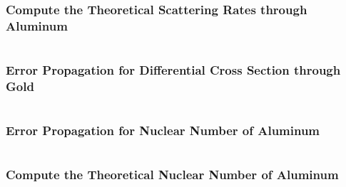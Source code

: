 \documentclass[a4paper]{article}
\begin{document}
\subsubsection{Compute the Theoretical Scattering Rates through Aluminum}
\label{cod:theoScatRateAl}
\inputminted{julia}{Code/getTheoScatRatesAl.jl}

\subsubsection{Error Propagation for Differential Cross Section through Gold}
\label{cod:uncertCrossSecAu}
\inputminted{julia}{Code/getUncertCrossSec}

\subsubsection{Error Propagation for Nuclear Number of Aluminum}
\label{cod:uncertNucNumAl}
\inputminted{julia}{Code/getUncertNucNumAl.jl}

\subsubsection{Compute the Theoretical Nuclear Number of Aluminum}
\label{cod:theoNucNumAl}
\inputminted{julia}{Code/getTheoNucNumAl.jl}
%
\end{document}
